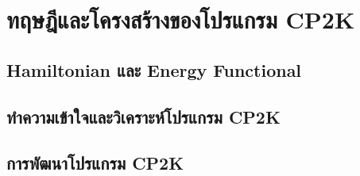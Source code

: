 

\chapter{ทฤษฎีและโครงสร้างของโปรแกรม CP2K}
\label{ap:cp2k}

\section{Hamiltonian และ Energy Functional}

\section{ทำความเข้าใจและวิเคราะห์โปรแกรม CP2K}

\section{การพัฒนาโปรแกรม CP2K}
